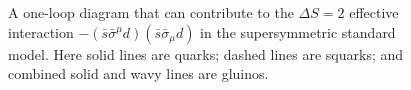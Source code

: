 \begin{figure}[H]
  \renewcommand{\thefigure}{28.1}
  \caption{A one-loop diagram that can contribute to the
  \(\Delta S=2\) effective interaction
  \(-(\bar s\bar\sigma^\mu d)(\bar s\bar\sigma_\mu d)\) in the
  supersymmetric standard model. Here solid lines are quarks; dashed
  lines are squarks; and combined solid and wavy lines are gluinos.}
  \label{fig:28.1}
\end{figure}

